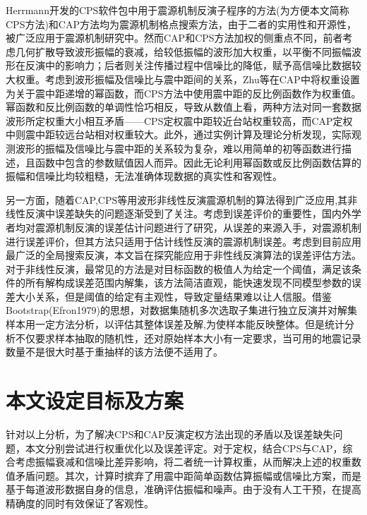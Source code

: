 Herrmann开发的CPS软件包中用于震源机制反演子程序的方法\citep{Herrmann1989}(为方便本文简称CPS方法)和CAP方法\citep{Zhao1994,Zhu1996,Tan2006}均为震源机制格点搜索方法，由于二者的实用性和开源性，被广泛应用于震源机制研究中。然而CAP和CPS方法加权的侧重点不同，前者考虑几何扩散导致波形振幅的衰减，给较低振幅的波形加大权重，以平衡不同振幅波形在反演中的影响力；后者则关注传播过程中信噪比的降低，赋予高信噪比数据较大权重。考虑到波形振幅及信噪比与震中距间的关系，Zhu等\citep{Zhu1996}在CAP中将权重设置为关于震中距递增的幂函数，而CPS方法中使用震中距的反比例函数作为权重值。幂函数和反比例函数的单调性恰巧相反，导致从数值上看，两种方法对同一套数据波形所定权重大小相互矛盾——CPS定权震中距较近台站权重较高，而CAP定权中则震中距较远台站相对权重较大。此外，通过实例计算及理论分析发现，实际观测波形的振幅及信噪比与震中距的关系较为复杂，难以用简单的初等函数进行描述，且函数中包含的参数赋值因人而异。因此无论利用幂函数或反比例函数估算的振幅和信噪比均较粗糙，无法准确体现数据的真实性和客观性。

另一方面，随着CAP,CPS等用波形非线性反演震源机制的算法得到广泛应用\citep{Luo2015,DAmico2014},其非线性反演中误差缺失的问题逐渐受到了关注。考虑到误差评价的重要性，国内外学者均对震源机制反演的误差估计问题进行了研究，\citet{Duputel2012}从误差的来源入手，对震源机制进行误差评价，但其方法只适用于估计线性反演的震源机制误差。考虑到目前应用最广泛的全局搜索反演，本文旨在探究能应用于非性线反演算法的误差评估方法。对于非线性反演，最常见的方法是对目标函数的极值人为给定一个阈值，满足该条件的所有解构成误差范围内解集，该方法简洁直观，能快速发现不同模型参数的误差大小关系，但是阈值的给定有主观性，导致定量结果难以让人信服。借鉴Bootstrap(Efron1979)的思想，对数据集随机多次选取子集进行独立反演并对解集样本用一定方法分析，以评估其整体误差及解,为使样本能反映整体。但是统计分析不仅要求样本抽取的随机性，还对原始样本大小有一定要求，当可用的地震记录数量不是很大时基于重抽样的该方法便不适用了。

\section{本文设定目标及方案}

针对以上分析，为了解决CPS和CAP反演定权方法出现的矛盾以及误差缺失问题，本文分别尝试进行权重优化以及误差评定。对于定权，结合CPS与CAP，综合考虑振幅衰减和信噪比差异影响，将二者统一计算权重，从而解决上述的权重数值矛盾问题。其次，计算时摈弃了用震中距简单函数估算振幅或信噪比方案，而是基于每道波形数据自身的信息，准确评估振幅和噪声。由于没有人工干预，在提高精确度的同时有效保证了客观性。

